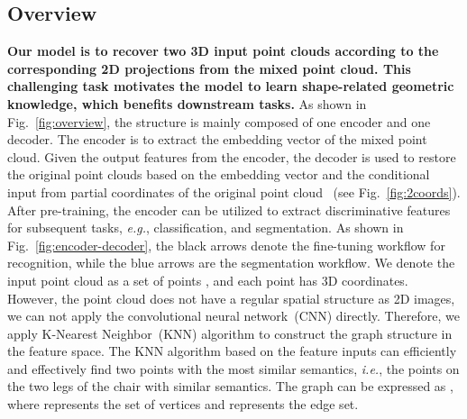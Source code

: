 \documentclass[journal]{IEEEtran}
\def\eg{\emph{e.g.}}
\def\ie{\emph{i.e.}}
\begin{document}
\subsection{Overview}
\textbf{Our model is to recover two 3D input point clouds according to the corresponding 2D projections from the mixed point cloud. This challenging task motivates the model to learn shape-related geometric knowledge, which benefits downstream tasks.}
As shown in Fig.~\ref{fig:overview}, the structure is mainly composed of one encoder and one decoder. The encoder is to extract the embedding vector of the mixed point cloud. Given the output features from the encoder, the decoder is used to restore the original point clouds based on the embedding vector and the conditional input from partial coordinates of the original point cloud ~(see Fig.~\ref{fig:2coords}).
After pre-training, the encoder can be utilized to extract discriminative features for subsequent tasks, \eg, classification, and segmentation. As shown in Fig.~\ref{fig:encoder-decoder}, the black arrows denote the fine-tuning workflow for recognition, while the blue arrows are the segmentation workflow. 
We denote the input point cloud as a set of points ,  and each point has 3D coordinates. However, the point cloud does not have a regular spatial structure as 2D images, we can not apply the convolutional neural network~(CNN) directly. 
Therefore, we apply K-Nearest Neighbor~(KNN) algorithm to construct the graph structure  in the feature space. The KNN algorithm based on the feature inputs can efficiently and effectively find two points with the most similar semantics, \ie, the points on the two legs of the chair with similar semantics. The graph can be expressed as , where  represents the set of vertices and  represents the edge set. 
\end{document}
